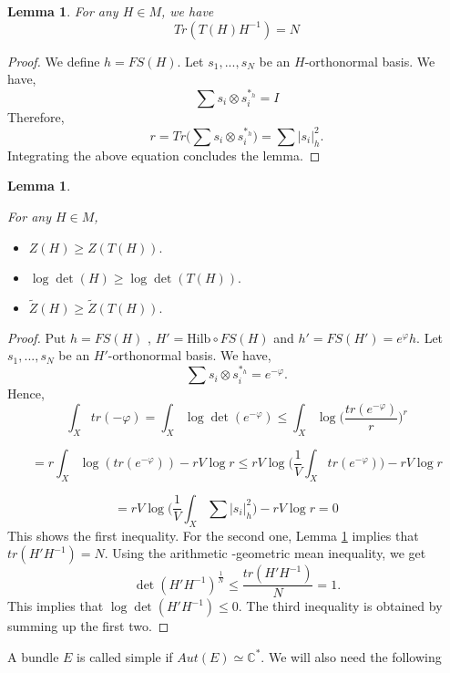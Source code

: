 \documentclass[12pt,oneside,notitlepage]{amsart}
\newtheorem{lem}[thm]{Lemma}
\theoremstyle{definition}
\theoremstyle{remark}
\numberwithin{equation}{section}
\begin{document}
\begin{lem}\label{newlemma1}
 For any $H \in M$, we have $$Tr(T(H)H^{-1})=N$$

\end{lem}

\begin{proof}
We define $h=FS(H)$. Let $s_{1},..., s_{N}$ be an $H$-orthonormal
basis. We have,
$$\sum s_{i}\otimes s_{i}^{*_{h}}=I$$
Therefore, $$r=Tr \big( \sum s_{i}\otimes s_{i}^{*_{h}} \big)=
\sum |s_{i}|^2_{h}.$$ Integrating the above equation concludes the
lemma.

\end{proof}

\begin{lem}\label{firstlemma}

For any $H \in M$,
\begin{itemize}

\item $Z(H)\geq Z(T(H)).$
 \item $\log\det (H) \geq\log\det(T(H)).$
\item $\widetilde{Z}(H)\geq \widetilde{Z}(T(H)).$
\end{itemize}

\end{lem}

\begin{proof}

Put $h=FS(H)$ , $H'=\textrm{Hilb}\circ FS(H)$ and
$h'=FS(H')=e^{\varphi}h$. Let $s_{1},..., s_{N}$ be an
$H'$-orthonormal basis.  We have,
$$\sum s_{i}\otimes s_{i}^{*_{h}}=e^{-\varphi}.$$ Hence,
$$\int_{X} tr(-\varphi)=\int_{X} \log\det (e^{-\varphi})\leq
\int_{X} \log \Big(\frac{tr(e^{-\varphi})}{r} \Big)^{r}$$

$$=r \int_{X} \log (tr(e^{-\varphi}))-rV\log r \leq r V\log \Big(\frac{1}{V}  \int_{X} tr(e^{-\varphi})  \Big)-r V\log r $$

$$=r V\log \Big(  \frac{1}{V}\int_{X} \sum |s_{i}|_{h}^{2}  \Big)-r V\log r =0\,\,\,\,\,\,\,\,\,\,$$
This shows the first inequality. For the second one, Lemma
\ref{newlemma1} implies that $tr(H'H^{-1})=N$. Using the
arithmetic -geometric mean inequality, we get
$$\det (H'H^{-1})^{\frac{1}{N}}\leq \frac{tr(H'H^{-1})}{N}=1.$$
This implies that  $\log \det (H'H^{-1}) \leq 0$. The third
inequality is obtained by summing up the first two.

\end{proof}

A bundle $E$ is called simple if $Aut(E)\simeq \mathbb{C}^*$. We
will also need the following
\end{document}
